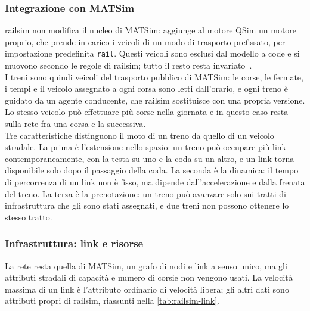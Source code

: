 \subsubsection{Integrazione con MATSim}
railsim non modifica il nucleo di MATSim: aggiunge al motore QSim un motore proprio, che prende in carico i veicoli di un modo di trasporto prefissato, per impostazione predefinita \texttt{rail}. Questi veicoli sono esclusi dal modello a code e si muovono secondo le regole di railsim; tutto il resto resta invariato~\cite{kaddoura2024railsim}. \\
I treni sono quindi veicoli del trasporto pubblico di MATSim: le corse, le fermate, i tempi e il veicolo assegnato a ogni corsa sono letti dall'orario, e ogni treno è guidato da un agente conducente, che railsim sostituisce con una propria versione. 
Lo stesso veicolo può effettuare più corse nella giornata e in questo caso resta sulla rete fra una corsa e la successiva.\\

Tre caratteristiche distinguono il moto di un treno da quello di un veicolo stradale. La prima è l'estensione nello spazio: un treno può occupare più link contemporaneamente, con la testa su uno e la coda su un altro, e un link torna disponibile solo dopo il passaggio della coda. La seconda è la dinamica: il tempo di percorrenza di un link non è fisso, ma dipende dall'accelerazione e dalla frenata del treno. La terza è la prenotazione: un treno può avanzare solo sui tratti di infrastruttura che gli sono stati assegnati, e due treni non possono ottenere lo stesso tratto.

\subsubsection{Infrastruttura: link e risorse}
La rete resta quella di MATSim, un grafo di nodi e link a senso unico, ma gli attributi stradali di capacità e numero di corsie non vengono usati. La velocità massima di un link è l'attributo ordinario di velocità libera; gli altri dati sono attributi propri di railsim, riassunti nella \cref{tab:railsim-link}.

